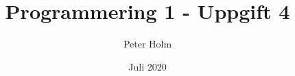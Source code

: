 \documentclass{article}
\title{Programmering 1 - Uppgift 4}
\author{Peter Holm}
\date{Juli 2020}
\begin{document}
\maketitle
\section{}

\newpage

\newpage


\newpage

\newpage


\newpage

\newpage

\newpage

\end{document}
